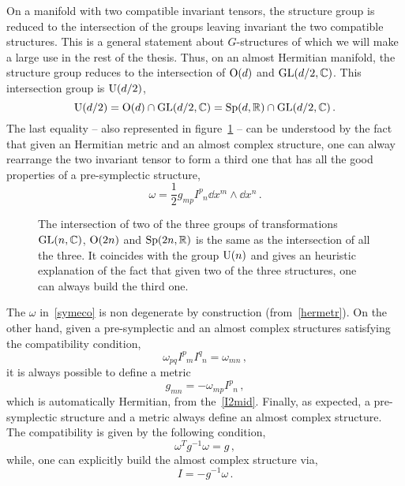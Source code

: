 \documentclass[debug]{phd}
\begin{document}
						On a manifold with two compatible invariant tensors, the structure group is reduced to the intersection of the groups leaving invariant the two compatible structures. 
						This is a general statement about $G$-structures of which we will make a large use in the rest of the thesis.
						Thus, on an almost Hermitian manifold, the structure group reduces to the intersection of $\mathrm{O}(d)$ and $\mathrm{GL}(d/2,\mathbb{C})$.
						This intersection group is $\mathrm{U}(d/2)$,
								\begin{equation}
									\mathrm{U}(d/2) = \mathrm{O}(d) \cap \mathrm{GL}(d/2, \mathbb{C}) = \mathrm{Sp}(d,\mathbb{R}) \cap \mathrm{GL}(d/2, \mathbb{C})\, .
								\end{equation}
						The last equality -- also represented in figure~\ref{Uinters} -- can be understood by the fact that given an Hermitian metric and an almost complex structure, one can alway rearrange the two invariant tensor to form a third one that has all the good properties of a pre-symplectic structure,
								\begin{equation}\label{symeco}
									\omega = \frac{1}{2} g_{mp} I^{p}_{\phantom{p}n} \dd x^m \wedge \dd x^n\, .
								\end{equation}
							\begin{figure}
							\centering
								
								\caption{%
									The intersection of two of the three groups of transformations $\mathrm{GL}(n, \mathbb{C})$, $\mathrm{O}(2n)$ and $\mathrm{Sp}(2n,\mathbb{R})$ is the same as the intersection of all the three. 
									It coincides with the group $\mathrm{U}(n)$ and gives an heuristic explanation of the fact that given two of the three structures, one can always build the third one.}
								\label{Uinters}
							\end{figure}
						The $\omega$ in~\eqref{symeco} is non degenerate by construction (from~\eqref{hermetr}).
						On the other hand, given a pre-symplectic and an almost complex structures satisfying the compatibility condition,
								\begin{equation}\label{hersym}
									\omega_{pq} I^{p}_{\phantom{p}m} I^{q}_{\phantom{q}n} = \omega_{mn}\, ,
								\end{equation}
						it is always possible to define a metric
								\begin{equation}\label{mesyco}
									g_{mn} = - \omega_{mp} I^{p}_{\phantom{p}n}\, ,
								\end{equation}
						which is automatically Hermitian, from the~\eqref{I2mid}.
						Finally, as expected, a pre-symplectic structure and a metric always define an almost complex structure.
						The compatibility is given by the following condition,
								\begin{equation}
									\omega^{T} g^{-1} \omega = g\, ,
								\end{equation}
						while, one can explicitly build the almost complex structure via,
								\begin{equation}
									I = - g^{-1} \omega\, .
								\end{equation}
\end{document}
